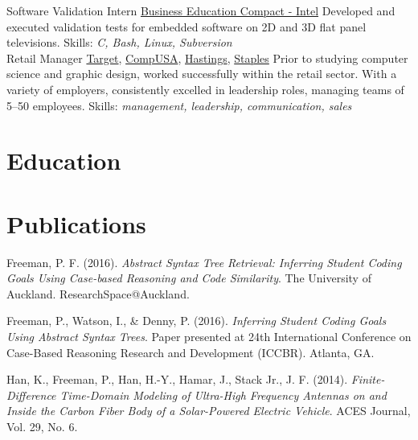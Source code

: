\documentclass[a4paper]{twentysecondcv}
\begin{document}
\begin{twenty}
           {}
           {Software Validation Intern}
           {\href{https://www.becpdx.org/}{Business Education Compact - Intel}}
           {}
           {Developed and executed validation tests for embedded software on 2D
           and 3D flat panel televisions.
           Skills: \emph{C, Bash, Linux, Subversion}} \\

           {}
           {Retail Manager}
           {\href{https://www.target.com/}{Target},
           \href{https://en.wikipedia.org/wiki/CompUSA}{CompUSA},
           \href{https://en.wikipedia.org/wiki/Hastings\_Entertainment}{Hastings},
           \href{https://www.staples.com/}{Staples}}
           {}
           {Prior to studying computer science and graphic design, worked
           successfully within the retail sector. With a variety of employers,
           consistently excelled in leadership roles, managing teams of 5--50
           employees.
           Skills: \emph{management, leadership, communication, sales}}

\end{twenty}

\section{Education}
\begin{twenty}
\end{twenty}

\section{Publications}
Freeman, P. F. (2016). \emph{Abstract Syntax Tree Retrieval: Inferring Student
Coding Goals Using Case-based Reasoning and Code Similarity}. The University of
Auckland. ResearchSpace@Auckland.

Freeman, P., Watson, I., \& Denny, P. (2016). \emph{Inferring Student Coding
Goals Using Abstract Syntax Trees}. Paper presented at 24th International
Conference on Case-Based Reasoning Research and Development (ICCBR). Atlanta, GA.\@

Han, K., Freeman, P., Han, H.-Y., Hamar, J., Stack Jr., J. F. (2014).
\emph{Finite-Difference Time-Domain Modeling of Ultra-High Frequency Antennas
on and Inside the Carbon Fiber Body of a Solar-Powered Electric Vehicle}. ACES
Journal, Vol. 29, No. 6.
\end{document}
